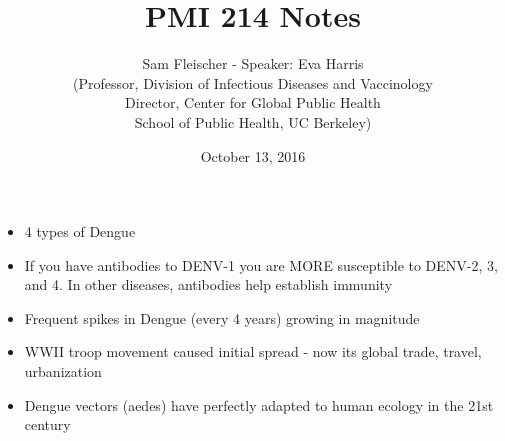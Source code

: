 \documentclass{article}
\title{PMI 214 Notes}
\author{Sam Fleischer - Speaker: Eva Harris\\ (Professor, Division of Infectious Diseases and Vaccinology \\ Director, Center for Global Public Health \\ School of Public Health, UC Berkeley)}
\date{October 13, 2016}
\begin{document}
    \maketitle

    \begin{itemize}
        \item 4 types of Dengue
        \item If you have antibodies to DENV-1 you are MORE susceptible to DENV-2, 3, and 4.  In other diseases, antibodies help establish immunity
        \item Frequent spikes in Dengue (every 4 years) growing in magnitude
        \item WWII troop movement caused initial spread - now its global trade, travel, urbanization
        \item Dengue vectors (aedes) have perfectly adapted to human ecology in the 21st century
    \end{itemize}
\end{document}
